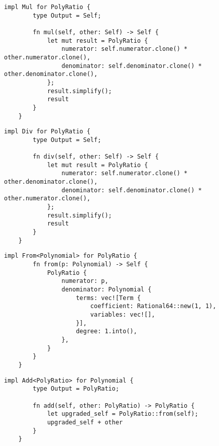 \begin{lstlisting}[caption={The implementation of the multiplication operation for the \texttt{PolyRatio} struct}, label={lst:polyratio-mul}]
    impl Mul for PolyRatio {
        type Output = Self;
    
        fn mul(self, other: Self) -> Self {
            let mut result = PolyRatio {
                numerator: self.numerator.clone() * other.numerator.clone(),
                denominator: self.denominator.clone() * other.denominator.clone(),
            };
            result.simplify();
            result
        }
    }
\end{lstlisting}

\begin{lstlisting}[caption={The implementation of the division operation for the \texttt{PolyRatio} struct}, label={lst:polyratio-div}]
    impl Div for PolyRatio {
        type Output = Self;
    
        fn div(self, other: Self) -> Self {
            let mut result = PolyRatio {
                numerator: self.numerator.clone() * other.denominator.clone(),
                denominator: self.denominator.clone() * other.numerator.clone(),
            };
            result.simplify();
            result
        }
    }
\end{lstlisting}

\begin{lstlisting}[caption={The implementation of the \texttt{from()} function for the \texttt{PolyRatio} struct}, label={lst:polyratio-from}]
    impl From<Polynomial> for PolyRatio {
        fn from(p: Polynomial) -> Self {
            PolyRatio {
                numerator: p,
                denominator: Polynomial {
                    terms: vec![Term {
                        coefficient: Rational64::new(1, 1),
                        variables: vec![],
                    }],
                    degree: 1.into(),
                },
            }
        }
    }
\end{lstlisting}

\begin{lstlisting}[caption={The implementation of the addition operation between \texttt{Polynomial} and \texttt{PolyRatio}}, label={lst:polyratio-polynomial-add}]
    impl Add<PolyRatio> for Polynomial {
        type Output = PolyRatio;
    
        fn add(self, other: PolyRatio) -> PolyRatio {
            let upgraded_self = PolyRatio::from(self);
            upgraded_self + other
        }
    }
\end{lstlisting}

